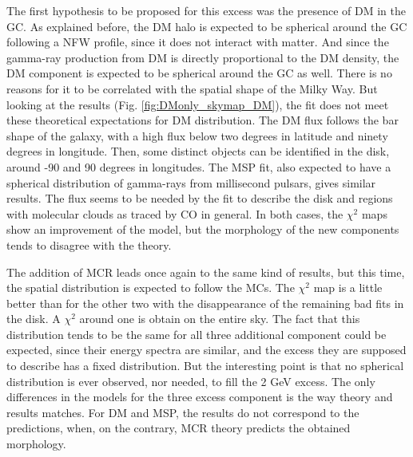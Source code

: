 The first hypothesis to be proposed for this excess was the presence of DM in the GC. As explained before, the DM halo is expected to be spherical around the GC following a NFW profile, since it does not interact with matter. And since the gamma-ray production from DM is directly proportional to the DM density, the DM component is expected to be spherical around the GC as well. There is no reasons for it to be correlated with the spatial shape of the Milky Way. But looking at the results (Fig. \ref{fig:DMonly_skymap_DM}), the fit does not meet these theoretical expectations for DM distribution. The DM flux follows the bar shape of the galaxy, with a high flux below two degrees in latitude and ninety degrees in longitude. Then, some distinct objects can be identified in the disk, around -90 and 90 degrees in longitudes.
The MSP fit, also expected to have a spherical distribution of gamma-rays from millisecond pulsars, gives similar results. The flux seems to be needed by the fit to describe the disk and regions with molecular clouds as traced by CO in general.
In both cases, the $\chi^2$ maps show an improvement of the model, but the morphology of the new components tends to disagree with the theory.




The addition of MCR leads once again to the same kind of results, but this time, the spatial distribution is expected to follow the MCs. The $\chi^2$ map is a little better than for the other two with the disappearance of the remaining bad fits in the disk. A $\chi^2$ around one is obtain on the entire sky. 
The fact that this distribution tends to be the same for all three additional component could be expected, since their energy spectra are similar, and the excess they are supposed to describe has a fixed distribution. But the interesting point is that no spherical distribution is ever observed, nor needed, to fill the 2 GeV excess. 
The only differences in the models for the three excess component is the way theory and results matches. For DM and MSP, the results do not correspond to the predictions, when, on the contrary, MCR theory predicts the obtained morphology.

